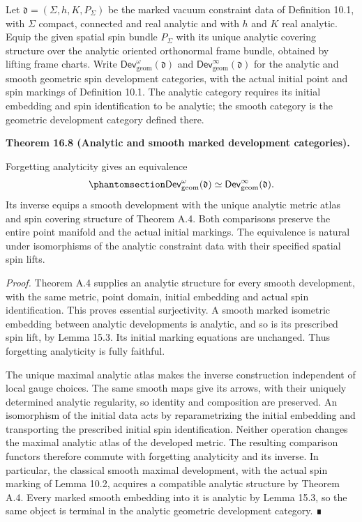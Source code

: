 \documentclass[
  english,
  11pt,
  reqno]{amsart}
\makeatletter
\newcommand{\pandocstatementheading}[1]{%
  \par\addpenalty{\@beginparpenalty}%
  \addvspace{.5\baselineskip plus .2\baselineskip minus .2\baselineskip}%
  {\normalfont\bfseries #1\par}%
  \nobreak\@afterindenttrue\@afterheading
}
\makeatother
\begin{document}
Let \(\mathfrak d=(\Sigma,h,K,P_\Sigma)\) be the marked vacuum
constraint data of Definition 10.1, with \(\Sigma\) compact, connected
and real analytic and with \(h\) and \(K\) real analytic. Equip the
given spatial spin bundle \(P_\Sigma\) with its unique analytic covering
structure over the analytic oriented orthonormal frame bundle, obtained
by lifting frame charts. Write
\(\mathsf{Dev}^{\omega}_{\mathrm{geom}}(\mathfrak d)\) and
\(\mathsf{Dev}^{\infty}_{\mathrm{geom}}(\mathfrak d)\) for the analytic
and smooth geometric spin development categories, with the actual
initial point and spin markings of Definition 10.1. The analytic
category requires its initial embedding and spin identification to be
analytic; the smooth category is the geometric development category
defined there.

\pandocstatementheading{\protect{}\label{thm:analytic-smooth-marked-development-equivalence}Theorem 16.8 (Analytic and smooth marked development categories).}

Forgetting analyticity gives an equivalence
\begin{equation}\protect\phantomsection\label{eq:analytic-smooth-marked-development-equivalence}{
\mathsf{Dev}^{\omega}_{\mathrm{geom}}(\mathfrak d)
\simeq
\mathsf{Dev}^{\infty}_{\mathrm{geom}}(\mathfrak d).
}\end{equation} Its inverse equips a smooth development with the unique
analytic metric atlas and spin covering structure of Theorem A.4. Both
comparisons preserve the entire point manifold and the actual initial
markings. The equivalence is natural under isomorphisms of the analytic
constraint data with their specified spatial spin lifts.

\emph{Proof.} Theorem A.4 supplies an analytic structure for every
smooth development, with the same metric, point domain, initial
embedding and actual spin identification. This proves essential
surjectivity. A smooth marked isometric embedding between analytic
developments is analytic, and so is its prescribed spin lift, by Lemma
15.3. Its initial marking equations are unchanged. Thus forgetting
analyticity is fully faithful.

The unique maximal analytic atlas makes the inverse construction
independent of local gauge choices. The same smooth maps give its
arrows, with their uniquely determined analytic regularity, so identity
and composition are preserved. An isomorphism of the initial data acts
by reparametrizing the initial embedding and transporting the prescribed
initial spin identification. Neither operation changes the maximal
analytic atlas of the developed metric. The resulting comparison
functors therefore commute with forgetting analyticity and its inverse.
In particular, the classical smooth maximal development, with the actual
spin marking of Lemma 10.2, acquires a compatible analytic structure by
Theorem A.4. Every marked smooth embedding into it is analytic by Lemma
15.3, so the same object is terminal in the analytic geometric
development category. ∎
\end{document}
